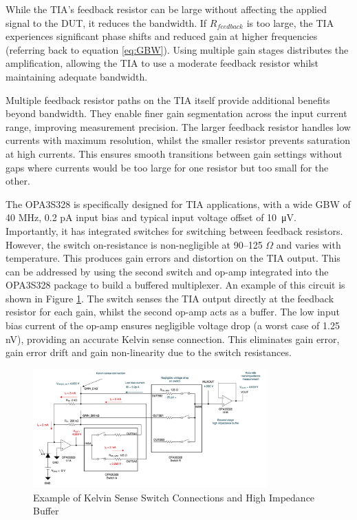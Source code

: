 While the \ac{TIA}'s feedback resistor can be large without affecting the applied signal to the \ac{DUT}, it reduces the bandwidth. If $R_{feedback}$ is too large, the \ac{TIA} experiences significant phase shifts and reduced gain at higher frequencies (referring back to equation \ref{eq:GBW}). Using multiple gain stages distributes the amplification, allowing the \ac{TIA} to use a moderate feedback resistor whilst maintaining adequate bandwidth.

Multiple feedback resistor paths on the \ac{TIA} itself provide additional benefits beyond bandwidth. They enable finer gain segmentation across the input current range, improving measurement precision. The larger feedback resistor handles low currents with maximum resolution, whilst the smaller resistor prevents saturation at high currents. This ensures smooth transitions between gain settings without gaps where currents would be too large for one resistor but too small for the other.

The OPA3S328 is specifically designed for \ac{TIA} applications, with a wide GBW of 40 MHz, 0.2 pA input bias and typical input voltage offset of \SI{10}{\micro\volt}. Importantly, it has integrated switches for switching between feedback resistors. However, the switch on-resistance is non-negligible at 90--125 $\Omega$ and varies with temperature. This produces gain errors and distortion on the \ac{TIA} output. This can be addressed by using the second switch and op-amp integrated into the OPA3S328 package to build a buffered multiplexer. An example of this circuit is shown in Figure \ref{fig:kelvin_sense_tia}. The switch senses the \ac{TIA} output directly at the feedback resistor for each gain, whilst the second op-amp acts as a buffer. The low input bias current of the op-amp ensures negligible voltage drop (a worst case of 1.25 nV), providing an accurate Kelvin sense connection. This eliminates gain error, gain error drift and gain non-linearity due to the switch resistances.

\begin{figure}[]
    \centering
    \includegraphics[width=0.8\textwidth]{KelvinSenseTIA.png}
    \caption{Example of Kelvin Sense Switch Connections and High Impedance Buffer\cite{chioyeBuildProgrammableGain2021}}
    \label{fig:kelvin_sense_tia}
\end{figure}

